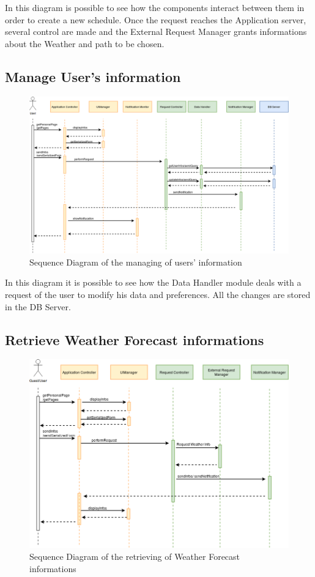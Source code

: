 \documentclass[numbers=noenddot, 12pt, a4paper, oneside]{scrbook}
\begin{document}
In this diagram is possible to see how the components interact between them in order to create a new schedule. Once the request reaches the Application server, several control are made and the External Request Manager grants informations about the Weather and path to be chosen.


\subsection*{Manage User's information}

\begin{figure}[H]
	\centering
	\includegraphics[width=1.1\textwidth,angle=-0]{images/Goal3}
	\caption{Sequence Diagram of the managing of users' information}
\end{figure}

In this diagram it is possible to see how the Data Handler module deals with a request of the user to modify his data and preferences. All the changes are stored in the DB Server.


\subsection*{Retrieve Weather Forecast informations}

\begin{figure}[H]
	\centering
	\includegraphics[width=1.1\textwidth,angle=-0]{images/Goal4}
	\caption{Sequence Diagram of the retrieving of Weather Forecast informations}
\end{figure}
\end{document}
